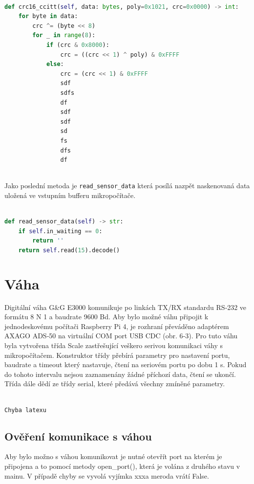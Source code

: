 \begin{lstlisting}[language=Python,breaklines=false, frame=single,postbreak=\mbox{\tiny$\hookrightarrow$}]

def crc16_ccitt(self, data: bytes, poly=0x1021, crc=0x0000) -> int:
    for byte in data:
        crc ^= (byte << 8)
        for _ in range(8):
            if (crc & 0x8000):
                crc = ((crc << 1) ^ poly) & 0xFFFF
            else:
                crc = (crc << 1) & 0xFFFF
                sdf
                sdfs
                df
                sdf
                sdf
                sd
                fs
                dfs
                df
                
\end{lstlisting}
\bigskip
Jako poslední metoda je \texttt{read\_sensor\_data} která posílá nazpět naskenovaná data uložená ve vstupním bufferu mikropočítače.
\begin{lstlisting}[language=Python,breaklines=false, frame=single,postbreak=\mbox{\tiny$\hookrightarrow$}]

def read_sensor_data(self) -> str:
    if self.in_waiting == 0:
        return ''
    return self.read(15).decode()
\end{lstlisting}

\section{Váha}
Digitální váha G\&G E3000 komunikuje po linkách TX/RX standardu RS‑232 ve formátu 8 N 1 a baudrate 9600 Bd. Aby bylo možné váhu připojit k jednodeskovému počítači Raspberry Pi 4, je rozhraní převáděno adaptérem AXAGO ADS‑50 na virtuální COM port USB CDC (obr. 6‑3). Pro tuto váhu byla vytvořena třída Scale zastřešující veškero serivou komunikaci váhy s mikropočítačem. Konstruktor třídy přebírá parametry pro nastavení portu, baudrate a timeout který nastavuje, čtení na seriovém portu po dobu 1 s. Pokud do tohoto intervalu nejsou zaznamenány žádné příchozí data, čtení se ukončí. Třída dále dědí ze třídy serial, které předává všechny zmíněné parametry.

\begin{lstlisting}[language=Python,breaklines=false, frame=single,postbreak=\mbox{\tiny$\hookrightarrow$}]

Chyba latexu
\end{lstlisting}

\subsection{Ověření komunikace s váhou}
Aby bylo možno s váhou komunikovat je nutné otevřít port na kterém je připojena a to pomocí metody open\_port(), která je volána z druhého stavu v mainu. V případě chyby se vyvolá vyjímka xxxa meroda vrátí False.

